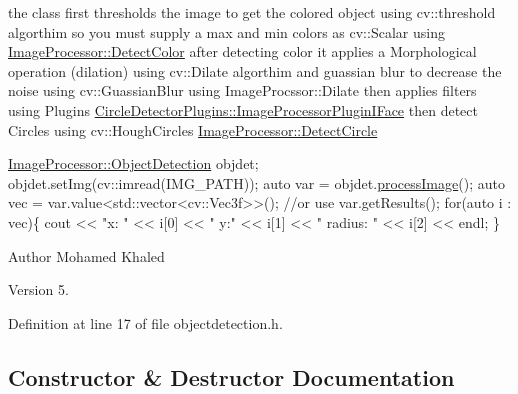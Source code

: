 the class first thresholds the image to get the colored object using cv\+::threshold algorthim so you must supply a max and min colors as cv\+::\+Scalar using \hyperlink{class_image_processor_1_1_detect_color}{Image\+Processor\+::\+Detect\+Color} after detecting color it applies a Morphological operation (dilation) using cv\+::\+Dilate algorthim and guassian blur to decrease the noise using cv\+::\+Guassian\+Blur using Image\+Procssor\+::\+Dilate then applies filters using Plugins \hyperlink{class_circle_detector_plugins_1_1_image_processor_plugin_i_face}{Circle\+Detector\+Plugins\+::\+Image\+Processor\+Plugin\+I\+Face} then detect Circles using cv\+::\+Hough\+Circles \hyperlink{class_image_processor_1_1_detect_circle}{Image\+Processor\+::\+Detect\+Circle} 
\begin{DoxyCode}
 \hyperlink{class_image_processor_1_1_object_detection}{ImageProcessor::ObjectDetection} objdet;
 objdet.setImg(cv::imread(IMG\_PATH));
 \textcolor{keyword}{auto} var = objdet.\hyperlink{class_image_processor_1_1_object_detection_ac5561650d95eac1672e2d049ed36201d}{processImage}();
 \textcolor{keyword}{auto} vec = var.value<std::vector<cv::Vec3f>>(); \textcolor{comment}{//or use var.getResults();}
\textcolor{keywordflow}{for}(\textcolor{keyword}{auto} i : vec)\{
     cout << \textcolor{stringliteral}{"x: "} << i[0] << \textcolor{stringliteral}{" y:"} << i[1] << \textcolor{stringliteral}{" radius: "} << i[2] << endl;
\}
\end{DoxyCode}
 \begin{DoxyAuthor}{Author}
Mohamed Khaled 
\end{DoxyAuthor}
\begin{DoxyVersion}{Version}
5. 
\end{DoxyVersion}


Definition at line 17 of file objectdetection.\+h.



\subsection{Constructor \& Destructor Documentation}
\mbox{\label{class_image_processor_1_1_object_detection_ab80e0235c8882a62f21faea4796b325f}} 
